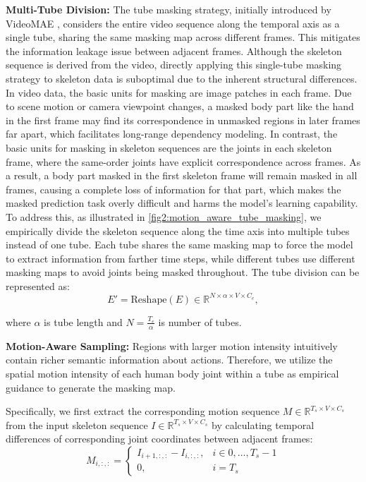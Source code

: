 \noindent \textbf{Multi-Tube Division:}
The tube masking strategy, initially introduced by VideoMAE \cite{tong2022videomae},
considers the entire video sequence along the temporal axis as a single tube,
sharing the same masking map across different frames. This mitigates the information
leakage issue between adjacent frames.
Although the skeleton sequence is derived from the
video, directly applying this single-tube
masking strategy to skeleton data is suboptimal due to the inherent structural differences.
In video data, the basic units for masking are image patches in each frame. Due to scene
motion or camera viewpoint changes, a masked body part like the hand in the first frame
may find its correspondence in unmasked regions in later frames far apart, which facilitates
long-range dependency modeling.
In contrast, the basic units for masking in skeleton sequences
are the joints in each skeleton frame, where the same-order joints have explicit correspondence
across frames. As a result, a body part masked in the first skeleton frame will remain
masked in all frames, causing a complete loss of information for that part, which makes
the masked prediction task overly difficult and harms the model's learning capability.
To address this, as illustrated in \cref{fig2:motion_aware_tube_masking},
we empirically divide the skeleton sequence along the time axis into multiple tubes
instead of one tube. Each tube shares the same masking map to force the model to extract
information from farther time steps, while different tubes use different masking maps
to avoid joints being masked throughout. The tube division can be represented as:
\begin{equation}
    \label{eq:deviding_tubes}
    E'=\text{Reshape}(E) \in \mathbb{R}^{N \times \alpha \times V \times C_{e}}, 
\end{equation}

\noindent where $\alpha$ is tube length and $N=\frac{T_{e}}{\alpha}$ is number of tubes.

\noindent \textbf{Motion-Aware Sampling:}
Regions with larger motion intensity intuitively contain richer semantic information
about actions. Therefore, we utilize the spatial motion intensity of each human body
joint within a tube as empirical guidance to generate the masking map.

Specifically, we first extract the corresponding motion sequence
$M \in \mathbb{R}^{T_{s} \times V \times C_{s}}$ from the input skeleton sequence
$I \in \mathbb{R}^{T_{s} \times V \times C_{s}}$ by calculating temporal differences
of corresponding joint coordinates between adjacent frames:
\begin{equation}
    \label{eq:motion}
    M_{i,:,:} = \begin{cases} 
    I_{i+1,:,:}-I_{i,:,:}, & i \in 0, \dots, T_{s}-1\\
    0, & i=T_{s}  
\end{cases}
\end{equation}

